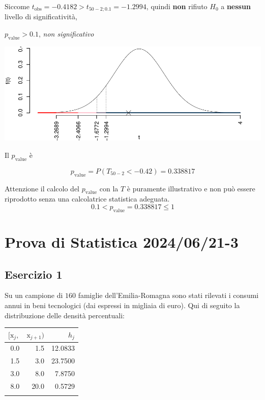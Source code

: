 \documentclass[
  11pt,
]{book}
\theoremstyle{mytheoremstyle}
\theoremstyle{mydefstyle}
\newenvironment{sol}
  {
  \begin{tcolorbox}[enhanced,breakable,arc=0.1mm,boxrule=1pt,colback=white,colframe=iblue,
  title=\bf \fontfamily{lmss}\selectfont \hspace{.5 cm} Soluzione,drop fuzzy shadow]

}{
\end{tcolorbox}
  }
\begin{document}
\begin{sol}
Siccome \(t_\text{obs}=-0.4182>t_{50-2;0.1}=-1.2994\), quindi \textbf{non} rifiuto \(H_0\) a \textbf{nessun} livello di significatività,

\(p_\text{value}>0.1\), \emph{non significativo}

\begin{center}\includegraphics{Esami_passati_con_soluzioni_files/figure-latex/2024-91-1} \end{center}

Il \(p_{\text{value}}\) è

\[ p_{\text{value}} = P(T_{50-2}<-0.42)=0.338817 \]

Attenzione il calcolo del \(p_\text{value}\) con la \(T\) è puramente illustrativo e non può essere riprodotto senza una calcolatrice statistica adeguata.\[
 0.1 < p_\text{value}= 0.338817 \leq 1 
\]

\end{sol}

\section{Prova di Statistica 2024/06/21-3}\label{prova-di-statistica-20240621-3}

\subsection{Esercizio 1}\label{esercizio-1-39}

Su un campione di \(160\) famiglie dell'Emilia-Romagna sono stati rilevati i consumi annui in beni tecnologici (dai espressi in migliaia di euro). Qui di seguito la distribuzione delle densità percentuali:

\begin{table}[H]
\centering
\begin{tabular}{rrr}
\toprule
$[\text{x}_j,$ & $\text{x}_{j+1})$ & $h_j$\\
\midrule
0.0 & 1.5 & 12.0833\\
1.5 & 3.0 & 23.7500\\
3.0 & 8.0 & 7.8750\\
8.0 & 20.0 & 0.5729\\
 &  & \\
\bottomrule
\end{tabular}
\end{table}
\end{document}

